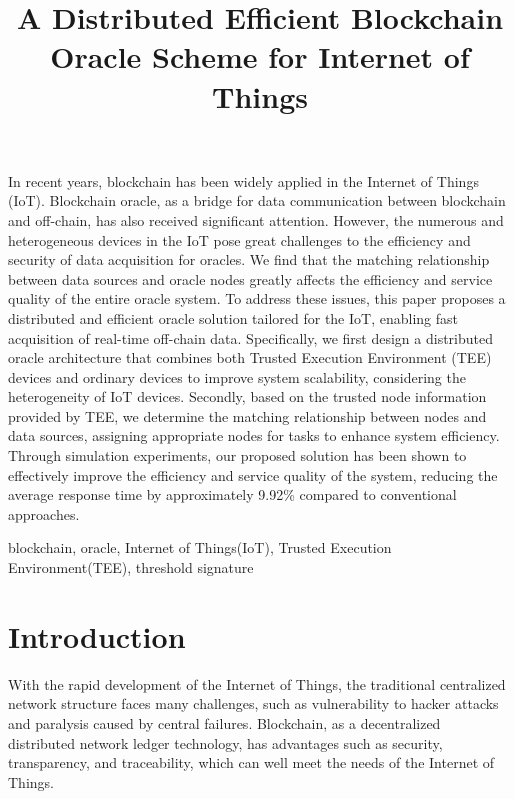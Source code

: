\documentclass[paper]{ieice}
\title{A Distributed Efficient Blockchain Oracle Scheme for Internet of Things}
\begin{document}
\maketitle
\begin{summary}
In recent years, blockchain has been widely applied in the Internet of Things (IoT). Blockchain oracle, as a bridge for data communication between blockchain and off-chain, has also received significant attention. However, the numerous and heterogeneous devices in the IoT pose great challenges to the efficiency and security of data acquisition for oracles. We find that the matching relationship between data sources and oracle nodes greatly affects the efficiency and service quality of the entire oracle system. To address these issues, this paper proposes a distributed and efficient oracle solution tailored for the IoT, enabling fast acquisition of real-time off-chain data. Specifically, we first design a distributed oracle architecture that combines both Trusted Execution Environment (TEE) devices and ordinary devices to improve system scalability, considering the heterogeneity of IoT devices. Secondly, based on the trusted node information provided by TEE, we determine the matching relationship between nodes and data sources, assigning appropriate nodes for tasks to enhance system efficiency. Through simulation experiments, our proposed solution has been shown to effectively improve the efficiency and service quality of the system, reducing the average response time by approximately 9.92\% compared to conventional approaches.
\end{summary}

\begin{keywords}
blockchain, oracle, Internet of Things(IoT), Trusted Execution Environment(TEE), threshold signature
\end{keywords}

\section{Introduction}\label{sec1}

With the rapid development of the Internet of Things, the traditional centralized network structure faces many challenges, such as vulnerability to hacker attacks and paralysis caused by central failures. Blockchain, as a decentralized distributed network ledger technology, has advantages such as security, transparency, and traceability, which can well meet the needs of the Internet of Things\cite{wang2020blockchain}.
\end{document}
